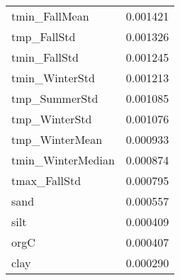 \begin{tabular}{lr}
tmin_FallMean & 0.001421 \\
tmp_FallStd & 0.001326 \\
tmin_FallStd & 0.001245 \\
tmin_WinterStd & 0.001213 \\
tmp_SummerStd & 0.001085 \\
tmp_WinterStd & 0.001076 \\
tmp_WinterMean & 0.000933 \\
tmin_WinterMedian & 0.000874 \\
tmax_FallStd & 0.000795 \\
sand & 0.000557 \\
silt & 0.000409 \\
orgC & 0.000407 \\
clay & 0.000290 \\
\bottomrule
\end{tabular}
